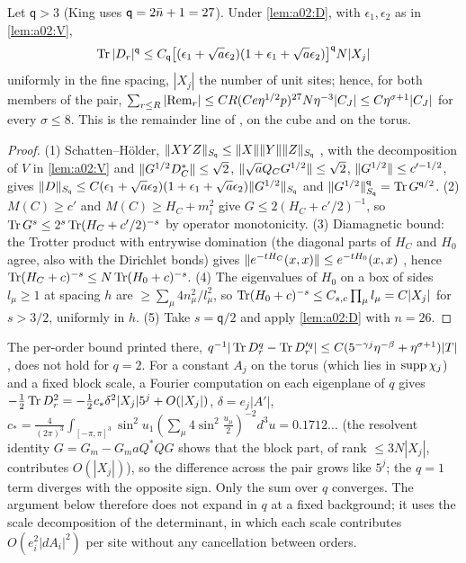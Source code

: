 \begin{lemma}\label{lem:a02:REM}
Let $\mathsf q>3$ (King uses $\mathsf q=2\bar n+1=27$). Under \cref{lem:a02:D}, with $\epsilon_1,\epsilon_2$ as in \cref{lem:a02:V},
\[
\operatorname{Tr}|D_r|^{\mathsf q}\le C_{\mathsf q}\big[(\epsilon_1+\sqrt a\epsilon_2)(1+\epsilon_1+\sqrt a\epsilon_2)\big]^{\mathsf q}N|X_j|
\]
uniformly in the fine spacing, $|X_j|$ the number of unit sites; hence, for both members of the pair, $\sum_{r\le R}|\mathrm{Rem}_r|\le CR(Ce\eta^{1/2}p)^{27}N\eta^{-3}|C_J|\le C\eta^{\sigma+1}|C_J|$ for every $\sigma\le8$. This is the remainder line of \cite[(3.98)]{K1}, on the cube and on the torus.
\end{lemma}
\begin{proof}
(1) Schatten--H\"older, $\lVert XYZ\rVert_{S_{\mathsf q}}\le\lVert X\rVert\lVert Y\rVert\lVert Z\rVert_{S_{\mathsf q}}$ \cite[Sect.~VI.6]{RS1}, with the decomposition of $V$ in \cref{lem:a02:V} and $\lVert G^{1/2}D_C^*\rVert\le\sqrt2$, $\lVert \sqrt aQ_CG^{1/2}\rVert\le\sqrt2$, $\lVert G^{1/2}\rVert\le c'^{-1/2}$, gives $\lVert D\rVert_{S_{\mathsf q}}\le C(\epsilon_1+\sqrt a\epsilon_2)(1+\epsilon_1+\sqrt a\epsilon_2)\lVert G^{1/2}\rVert_{S_{\mathsf q}}$ and $\lVert G^{1/2}\rVert^{\mathsf q}_{S_{\mathsf q}}=\operatorname{Tr} G^{{\mathsf q}/2}$. (2) $M(C)\ge c'$ and $M(C)\ge H_C+m_i^2$ give $G\le2(H_C+c'/2)^{-1}$, so $\operatorname{Tr} G^s\le2^s\operatorname{Tr}(H_C+c'/2)^{-s}$ by operator monotonicity. (3) Diamagnetic bound: the Trotter product with entrywise domination (the diagonal parts of $H_C$ and $H_0$ agree, also with the Dirichlet bonds) gives $\lVert e^{-tH_C}(x,x)\rVert\le e^{-tH_0}(x,x)$ \cite{BFS1}, hence $\operatorname{Tr}(H_C+c)^{-s}\le N\operatorname{Tr}(H_0+c)^{-s}$. (4) The eigenvalues of $H_0$ on a box of sides $l_\mu\ge1$ at spacing $h$ are $\ge\sum_\mu4n_\mu^2/l_\mu^2$, so $\operatorname{Tr}(H_0+c)^{-s}\le C_{s,c}\prod_\mu l_\mu=C|X_j|$ for $s>3/2$, uniformly in $h$. (5) Take $s={\mathsf q}/2$ and apply \cref{lem:a02:D} with $n=26$.
\end{proof}

\begin{remark}\label{rem:a02:FP}
The per-order bound printed there, $q^{-1}|\operatorname{Tr} D_r^q-\operatorname{Tr} D_r'^q|\le C(5^{-\gamma j}\eta^{-\beta}+\eta^{\sigma+1})|T|$, does not hold for $q=2$. For a constant $A_j$ on the torus (which lies in $\operatorname{supp}\chi_j$) and a fixed block scale, a Fourier computation on each eigenplane of $q$ gives $-\frac12\operatorname{Tr} D_r^2=-\frac12c_*\delta^2|X_j|5^{j}+O(|X_j|)$, $\delta=e_j|A'|$, $c_*=\frac4{(2\pi)^3}\int_{[-\pi,\pi]^3}\sin^2u_1(\sum_\mu4\sin^2\frac{u_\mu}2)^{-2}d^3u=0.1712\ldots$ (the resolvent identity $G=G_m-G_maQ^*QG$ shows that the block part, of rank $\le3N|X_j|$, contributes $O(|X_j|)$), so the difference across the pair grows like $5^{j}$; the $q=1$ term diverges with the opposite sign. Only the sum over $q$ converges. The argument below therefore does not expand in $q$ at a fixed background; it uses the scale decomposition of the determinant, in which each scale contributes $O(e_i^2|dA_i|^2)$ per site without any cancellation between orders.
\end{remark}

